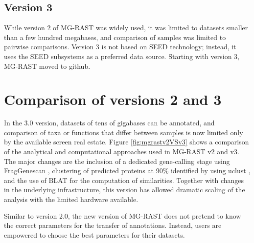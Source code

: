 \documentclass[12pt,fullpage]{report}
\begin{document}
\subsection*{Version 3}
While version 2 of MG-RAST was widely used, it was limited to datasets smaller than a few hundred megabases, and comparison of samples was limited to pairwise comparisons. Version 3 is not based on \gls{SEED} technology; instead, it uses the SEED subsystems as a preferred data source.
Starting with version 3, MG-RAST moved to github.
\section{Comparison of versions 2 and 3}

In the 3.0 version, datasets of tens of gigabases can be annotated, and comparison of taxa or functions that differ between samples is now limited only by the available screen real estate. Figure \ref{fig:mgrastv2VSv3} shows a comparison of the analytical and computational approaches used in MG-RAST v2 and v3. The major changes are the inclusion of a dedicated gene-calling stage using FragGenescan \cite{FGS}, clustering of predicted proteins at 90\% identified by using uclust \cite{UCLUST}, and the use of BLAT \cite{BLAT} for the computation of similarities. Together with changes in the underlying infrastructure, this version has allowed dramatic scaling of the analysis with the limited hardware available.

Similar to version 2.0, the new version of MG-RAST does not pretend to know the correct parameters for the transfer of annotations. Instead, users are empowered to choose the best parameters for their datasets.
\end{document}
